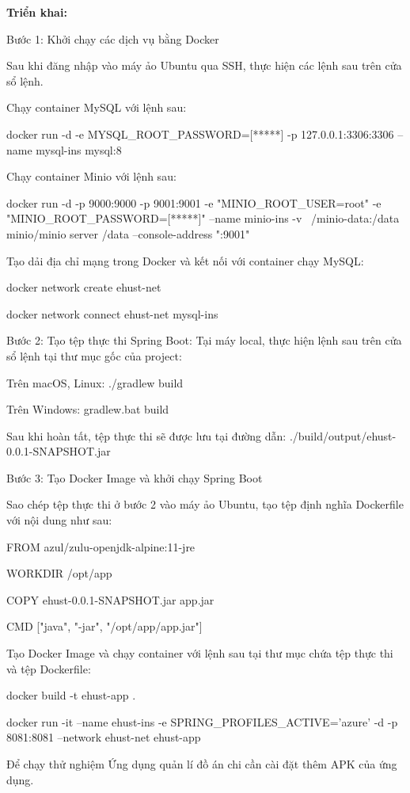 \documentclass[../Main.tex]{subfiles}
\begin{document}
\textbf{Triển khai:}

Bước 1: Khởi chạy các dịch vụ bằng Docker

Sau khi đăng nhập vào máy ảo Ubuntu qua SSH, thực hiện các lệnh sau trên cửa sổ lệnh.

Chạy container MySQL với lệnh sau:

docker run -d -e MYSQL\_ROOT\_PASSWORD=[*****] -p 127.0.0.1:3306:3306 --name mysql-ins mysql:8

Chạy container Minio với lệnh sau:

docker run -d -p 9000:9000 -p 9001:9001 -e "MINIO\_ROOT\_USER=root" -e "MINIO\_ROOT\_PASSWORD=[*****]" --name minio-ins -v ~/minio-data:/data minio/minio server /data --console-address ":9001"

Tạo dải địa chỉ mạng trong Docker và kết nối với container chạy MySQL:

docker network create ehust-net

docker network connect ehust-net mysql-ins

Bước 2: Tạo tệp thực thi Spring Boot:
Tại máy local, thực hiện lệnh sau trên cửa sổ lệnh tại thư mục gốc của project:

Trên macOS, Linux:
./gradlew build 

Trên Windows:
gradlew.bat build

	Sau khi hoàn tất, tệp thực thi sẽ được lưu tại đường dẫn: ./build/output/ehust-0.0.1-SNAPSHOT.jar

Bước 3: Tạo Docker Image và khởi chạy Spring Boot

Sao chép tệp thực thi ở bước 2 vào máy ảo Ubuntu, tạo tệp định nghĩa Dockerfile với nội dung như sau:

FROM azul/zulu-openjdk-alpine:11-jre

WORKDIR /opt/app

COPY ehust-0.0.1-SNAPSHOT.jar app.jar

CMD ["java", "-jar", "/opt/app/app.jar"]

Tạo Docker Image và chạy container với lệnh sau tại thư mục chứa tệp thực thi và tệp Dockerfile:

docker build -t ehust-app .

docker run -it --name ehust-ins -e SPRING\_PROFILES\_ACTIVE='azure' -d -p 8081:8081 --network ehust-net ehust-app

 Để chạy thử nghiệm Ứng dụng quản lí đồ án chi cần cài đặt thêm APK của ứng dụng.
\end{document}
